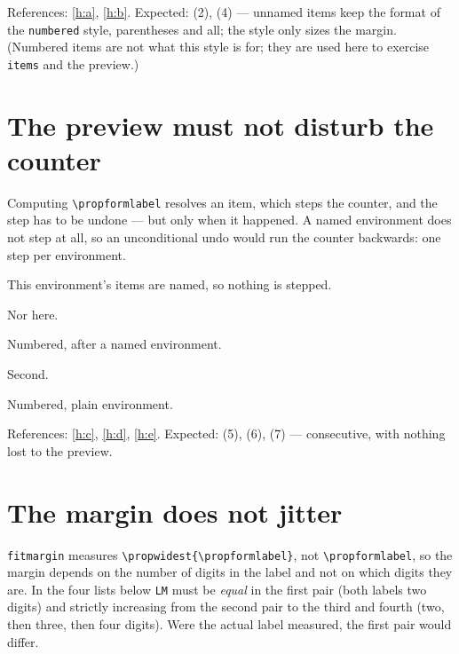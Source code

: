 \documentclass{article}
\begin{document}
References: \ref{h:a}, \ref{h:b}.  Expected: (2), (4) --- unnamed items keep
the format of the \texttt{numbered} style, parentheses and all; the style only
sizes the margin.  (Numbered items are not what this style is for; they are
used here to exercise \texttt{items} and the preview.)

\section{The preview must not disturb the counter}

Computing \verb|\propformlabel| resolves an item, which steps the counter, and
the step has to be undone --- but only when it happened.  A named environment
does not step at all, so an unconditional undo would run the counter backwards:
one step per environment.

\begin{prop}[name=Named, style=fitmargin]
  \item This environment's items are named, so nothing is stepped.
  \item Nor here.
\end{prop}

\begin{prop}[style=fitmargin, items=20]
  \item Numbered, after a named environment. \label{h:c}
  \item Second. \label{h:d}
\end{prop}

\begin{prop}
  \item Numbered, plain environment. \label{h:e}
\end{prop}

References: \ref{h:c}, \ref{h:d}, \ref{h:e}.  Expected: (5), (6), (7) ---
consecutive, with nothing lost to the preview.

\section{The margin does not jitter}

\verb|fitmargin| measures \verb|\propwidest{\propformlabel}|, not \verb|\propformlabel|, so
the margin depends on the number of digits in the label and not on which digits
they are.  In the four lists below \texttt{LM} must be \emph{equal} in the first
pair (both labels two digits) and strictly increasing from the second pair to
the third and fourth (two, then three, then four digits).  Were the actual
label measured, the first pair would differ.
\end{document}

